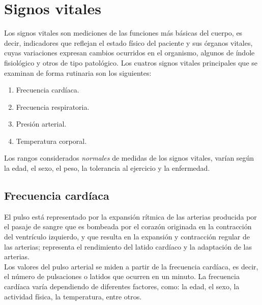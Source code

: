 \section{Signos vitales}
	Los signos vitales son mediciones de las funciones más básicas del cuerpo, es decir, indicadores que reflejan el estado físico del paciente y sus órganos vitales, cuyas variaciones expresan cambios ocurridos en el organismo, algunos de índole fisiológico y otros de tipo patológico. \cite{aguayoChile} \cite{cobo2011} 
	Los cuatros signos vitales principales que se examinan de forma rutinaria son los siguientes:
	
	\begin{enumerate}
		\item Frecuencia cardíaca.
		\item Frecuencia respiratoria.
		\item Presión arterial.
		\item Temperatura corporal.
	\end{enumerate}

	Los rangos considerados \textit{normales} de medidas de los signos vitales, varían según la edad, el sexo, el peso, la tolerancia al ejercicio y la enfermedad.
	
	\subsection{Frecuencia cardíaca}
	El pulso está representado por la expansión rítmica de las arterias producida por el pasaje de sangre que es bombeada por el corazón originada en la contracción del ventrículo izquierdo, y que resulta en la expansión y contracción regular de las arterias; representa el rendimiento del latido cardíaco y la adaptación de las arterias.  \cite{aguayoChile} \cite{signos2017} \\
	
	Los valores del pulso arterial se miden a partir de la frecuencia cardíaca, es decir, el número de pulsaciones o latidos que ocurren en un minuto. La frecuencia cardíaca varía dependiendo de diferentes factores, como: la edad, el sexo, la actividad física, la temperatura, entre otros. \cite{valoresFreq}
	

